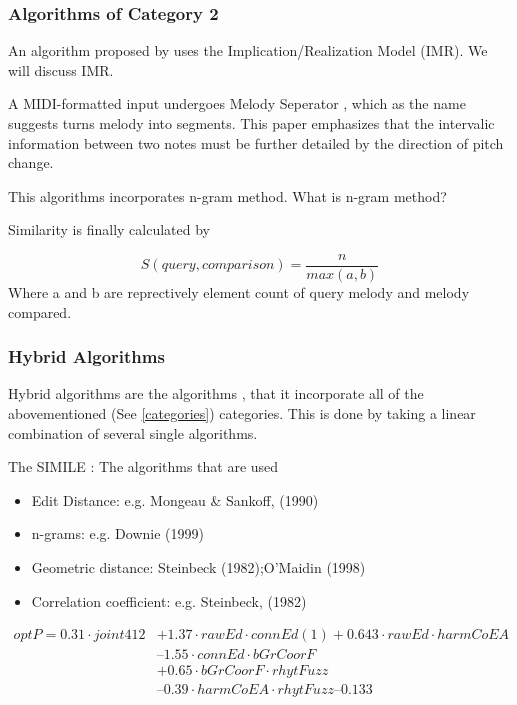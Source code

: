 \documentclass{article}
\begin{document}
			\vspace{200px}
			\subsubsection{Algorithms of Category 2}
					An algorithm proposed by \cite{two_point_five} uses the Implication/Realization Model (IMR).
					We will discuss IMR.

					A MIDI-formatted input undergoes Melody Seperator , which as the name suggests turns melody into segments.
					This paper emphasizes that the intervalic information between two notes must be further detailed by the direction of pitch change.


					This algorithms incorporates n-gram method.
					What is n-gram method?

					Similarity is finally calculated by

					\begin{equation}
						S(query , comparison) = \frac{n}{max(a,b)}
					\end{equation}
					{Where a and b are reprectively element count of query melody and melody compared.}


					

			\newpage
			\subsubsection{Hybrid Algorithms}
				Hybrid algorithms are the algorithms , that it incorporate all of the abovementioned (See \ref{categories}) categories. This is done by taking a linear combination of several single algorithms.
 
				The SIMILE \cite{two_point_two}:
					The algorithms that are used 
						\begin{itemize}
							\item Edit Distance: e.g. Mongeau \& Sankoff, (1990)
							\item n-grams: e.g. Downie (1999)
							\item Geometric distance: Steinbeck (1982);O'Maidin (1998)
							\item Correlation coefficient: e.g. Steinbeck, (1982)
						\end{itemize}

					\begin{align*}
						optP = 0.31 \cdot joint412 &+ 1.37 \cdot rawEd \cdot connEd (1) + 0.643 \cdot rawEd \cdot harmCoEA\\
						&– 1.55\cdot connEd \cdot bGrCoorF\\
						&+ 0.65\cdot bGrCoorF\cdot rhytFuzz\\
						&– 0.39\cdot harmCoEA\cdot rhytFuzz – 0.133	
					\end{align*}
\end{document}
